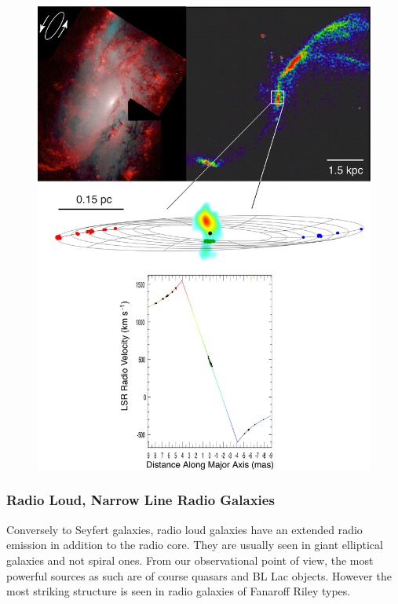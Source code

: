 \documentclass[10pt,a4paper,english]{article}
\begin{document}
\begin{figure}[!ht]
\begin{minipage}{.49\textwidth}
        \includegraphics[width=\textwidth]{ngc4258_combo_hst_hi.jpg}
    \end{minipage}
\end{figure}

\subsubsection{Radio Loud, Narrow Line Radio Galaxies}

Conversely to Seyfert galaxies, radio loud galaxies have an extended radio
emission in addition to the radio core. They are usually seen in giant
elliptical galaxies and not spiral ones. From our observational point of view,
the most powerful sources as such are of course quasars and BL Lac objects.
However the most striking structure is seen in radio galaxies of Fanaroff Riley
types.
\end{document}

